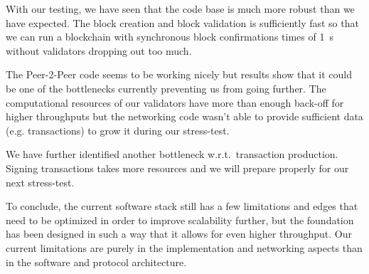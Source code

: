 With our testing, we have seen that the code base is much more robust
than we have expected. The block creation and block validation is
sufficiently fast so that we can run a blockchain with synchronous block
confirmations times of \SI{1}{s} without validators dropping out too
much.

The Peer-2-Peer code seems to be working nicely but results show that it
could be one of the bottlenecks currently preventing us from going
further. The computational resources of our validators have more than
enough back-off for higher throughputs but the networking code wasn't
able to provide sufficient data (e.g. transactions) to grow it during
our stress-test.

We have further identified another bottleneck w.r.t.\ transaction
production. Signing transactions takes more resources and we will
prepare properly for our next stress-test.

To conclude, the current software stack still has a few limitations and
edges that need to be optimized in order to improve scalability further,
but the foundation has been designed in such a way that it allows for
even higher throughput. Our current limitations are purely in the
implementation and networking aspects than in the software and protocol
architecture.
